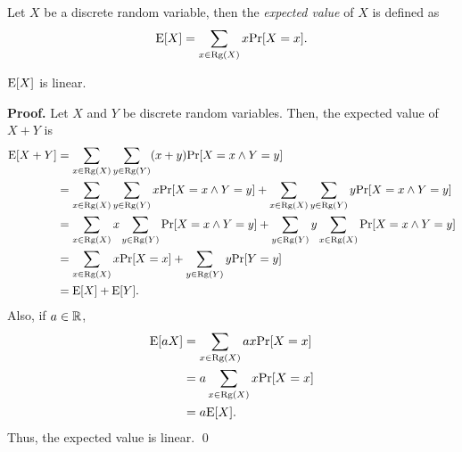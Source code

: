 Let $X$ be a discrete random variable, then the \textit{expected value} of $X$ is defined as 
\[\mathrm{E}[X] = \sum_{x \in \mathrm{Rg}(X)} x\mathrm{Pr}[X = x].\]
\begin{theorem}
    \(\mathrm{E}[X]\) is linear. 
\end{theorem}
\textbf{Proof. } Let $X$ and $Y$ be discrete random variables. Then, the expected value of $X + Y$ is
\begin{align*}
    \mathrm{E}[X + Y] &= \sum_{x \in \mathrm{Rg}(X)} \sum_{y \in \mathrm{Rg}(Y)} (x + y)\mathrm{Pr}[X = x \wedge Y = y] \\
    &= \sum_{x \in \mathrm{Rg}(X)} \sum_{y \in \mathrm{Rg}(Y)} x\mathrm{Pr}[X = x \wedge Y = y] + \sum_{x \in \mathrm{Rg}(X)} \sum_{y \in \mathrm{Rg}(Y)} y\mathrm{Pr}[X = x \wedge Y = y] \\
    &= \sum_{x \in \mathrm{Rg}(X)} x\sum_{y \in \mathrm{Rg}(Y)} \mathrm{Pr}[X = x \wedge Y = y] + \sum_{y \in \mathrm{Rg}(Y)} y\sum_{x \in \mathrm{Rg}(X)} \mathrm{Pr}[X = x \wedge Y = y] \\
    &= \sum_{x \in \mathrm{Rg}(X)} x\mathrm{Pr}[X = x] + \sum_{y \in \mathrm{Rg}(Y)} y\mathrm{Pr}[Y = y] \\
    &= \mathrm{E}[X] + \mathrm{E}[Y].
\end{align*}
Also, if $a \in \mathbb{R}$,
\begin{align*}
    \mathrm{E}[aX] &= \sum_{x \in \mathrm{Rg}(X)} ax\mathrm{Pr}[X = x] \\
    &= a\sum_{x \in \mathrm{Rg}(X)} x\mathrm{Pr}[X = x] \\
    &= a\mathrm{E}[X].  
\end{align*}
Thus, the expected value is linear. \qed \par

